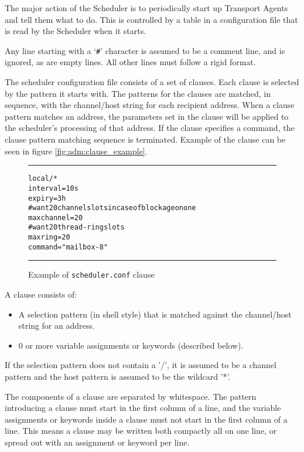 
The major action of the Scheduler is to periodically start up Transport
Agents and tell them what to do.  This is controlled by a table in a
configuration file that is read by the Scheduler when it starts.  

Any line starting with a `{\tt \#}' character is assumed to be a comment 
line, and is ignored, as are empty lines.  All other lines must follow a rigid
format. 

The scheduler configuration file consists of a set  of
clauses. Each clause is selected by the pattern it starts
with. The patterns  for  the  clauses   are  matched,  in
sequence, with the channel/host string for each recipient
address. When a clause pattern matches  an  address,  the
parameters set in the clause will be applied to the scheduler's 
processing of that address. If the clause specifies a command,  
the clause pattern matching sequence is terminated.
Example of the clause can be seen in figure \vref{fig:adm:clause_example}.

\begin{figure*}
\begin{alltt}\hrule\medskip
local/*
        interval=10s
        expiry=3h
        # want 20 channel slots in case of blockage on one
        maxchannel=20
        # want 20 thread-ring slots
        maxring=20
        command="mailbox -8"
\medskip\hrule\end{alltt}\medskip
\caption{\label{fig:adm:clause_example}Example of {\tt scheduler.conf} clause}
\end{figure*}

A clause consists of:

\begin{itemize}
\item A selection pattern  (in  shell style) that  is
matched  against        the  channel/host  string  for an
address.
\item 0  or more  variable assignments or keywords
(described below).
\end{itemize}


If the selection pattern does not contain a '/', it is
assumed to be a channel pattern and the host  pattern  is
assumed to be the wildcard '*'.

The components of a clause are separated by whitespace.
The pattern introducing a clause must start in the first
column of a line, and the variable assignments or keywords
inside a clause must not start in the first  column of a
line. This means a clause may be written both compactly
all on one line, or spread out with an assignment or keyword per line.

